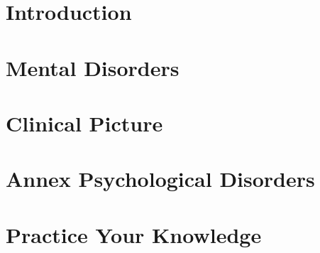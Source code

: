\documentclass[../main.tex]{subfiles}
\begin{document}
\chapter{Introduction}



\chapter{Mental Disorders}


\chapter{Clinical Picture}

\chapter{Annex Psychological Disorders}

\chapter{Practice Your Knowledge}

~\cite{EQDE} %
\end{document}
